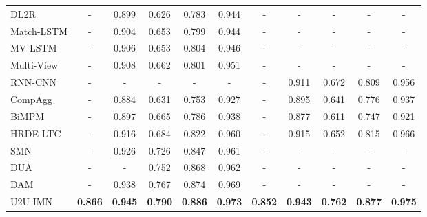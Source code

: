 \documentclass[journal]{IEEEtran}
\begin{document}
\begin{table*}[!hbt]
\begin{tabular}{l|c|c|c|c|c|c|c|c|c|c}
       DL2R \cite{DBLP:conf/sigir/YanSW16}                &-& 0.899 & 0.626 & 0.783 & 0.944 &-& -     & -     & -     & -     \\
       Match-LSTM \cite{DBLP:conf/naacl/WangJ16}          &-& 0.904 & 0.653 & 0.799 & 0.944 &-& -     & -     & -     & -     \\
       MV-LSTM \cite{DBLP:conf/ijcai/WanLXGPC16}          &-& 0.906 & 0.653 & 0.804 & 0.946 &-& -     & -     & -     & -     \\
       Multi-View \cite{DBLP:conf/emnlp/ZhouDWZYTLY16}    &-& 0.908 & 0.662 & 0.801 & 0.951 &-& -     & -     & -     & -     \\
       RNN-CNN \cite{DBLP:journals/corr/BaudisS16}        &-& -     & -     & -     & -     &-& 0.911 & 0.672 & 0.809 & 0.956 \\
       CompAgg \cite{DBLP:journals/corr/WangJ16b}         &-& 0.884 & 0.631 & 0.753 & 0.927 &-& 0.895 & 0.641 & 0.776 & 0.937 \\
       BiMPM \cite{DBLP:conf/ijcai/WangHF17}              &-& 0.897 & 0.665 & 0.786 & 0.938 &-& 0.877 & 0.611 & 0.747 & 0.921 \\
       HRDE-LTC \cite{DBLP:conf/naacl/YoonSJ18}           &-& 0.916 & 0.684 & 0.822 & 0.960 &-& 0.915 & 0.652 & 0.815 & 0.966 \\
      \hline
       SMN \cite{DBLP:conf/acl/WuWXZL17}                  &-& 0.926 & 0.726 & 0.847 & 0.961 &-& -     & -     & -     & -     \\
       DUA \cite{DBLP:conf/coling/ZhangLZZL18}            &-& -     & 0.752 & 0.868 & 0.962 &-& -     & -     & -     & -     \\
       DAM \cite{DBLP:conf/acl/WuLCZDYZL18}               &-& 0.938 & 0.767 & 0.874 & 0.969 &-& -     & -     & -     & -     \\
      \hline
       U2U-IMN                                            & \textbf{0.866} & \textbf{0.945} & \textbf{0.790} & \textbf{0.886} & \textbf{0.973} & \textbf{0.852} & \textbf{0.943} & \textbf{0.762} & \textbf{0.877} & \textbf{0.975} \\
      \bottomrule
      \end{tabular}
    \end{table*}
\end{document}
